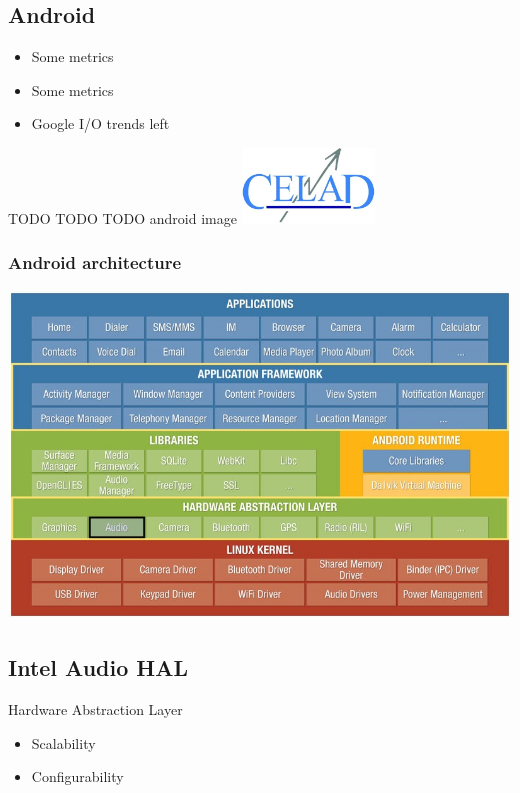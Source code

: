\subsection{Android}
\begin{FrameWithSubSection}
    \begin{minipage}{0.49\textwidth}
        \begin{itemize}
            \item Some metrics
            \item Some metrics
            \item Google I/O trends left
        \end{itemize}
    \end{minipage}
    \begin{minipage}{0.49\textwidth}
        \flushright
        TODO TODO TODO android image
        \includegraphics[height=2cm]{../../report/src/img/logocelad.jpg}
    \end{minipage}
\end{FrameWithSubSection}
\begin{FrameWithSubSection}
    \frametitle{Android architecture}
    \includegraphics[width=\textwidth]{../../report/src/img/android-archi-audio-hal.jpeg}
\end{FrameWithSubSection}

\subsection{Intel Audio HAL}
\begin{FrameWithSubSection}
    \begin{block}{Hardware Abstraction Layer}
        \begin{itemize}
            \item Scalability
            \item Configurability
        \end{itemize}
    \end{block}
\end{FrameWithSubSection}

